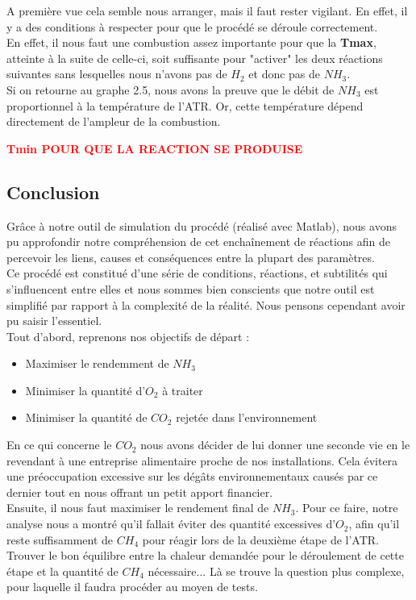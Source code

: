 \documentclass[12pt]{report}
\begin{document}
A première vue cela semble nous arranger, mais il faut rester vigilant. En effet, il y a des conditions à respecter pour que le procédé se déroule correctement.\\

En effet, il nous faut une combustion assez importante pour que la \textbf{Tmax}, atteinte à la suite de celle-ci, soit suffisante pour "activer" les deux réactions suivantes sans lesquelles nous n'avons pas de $H_2$ et donc pas de $NH_3$.\\
Si on retourne au graphe 2.5, nous avons la preuve que le débit de $NH_3$ est proportionnel à la température de l'ATR. Or, cette température dépend directement de l'ampleur de la combustion. 
\bigskip

\begin{Huge}
\textcolor{red}{\textbf{Tmin POUR QUE LA REACTION SE PRODUISE }}
\end{Huge}

{\textcolor{carmine}{\chapter{Conclusion}}}

Grâce à notre outil de simulation du procédé (réalisé avec Matlab), nous avons pu approfondir notre compréhension de cet enchaînement de réactions afin de percevoir les liens, causes et conséquences entre la plupart des paramètres.\\
Ce procédé est constitué d'une série de conditions, réactions, et subtilités qui s'influencent entre elles et nous sommes bien conscients que notre outil est simplifié par rapport à la complexité de la réalité. Nous pensons cependant avoir pu saisir l'essentiel.\\

Tout d'abord, reprenons nos objectifs de départ : \\
\begin{itemize}
\item Maximiser le rendemment de $NH_3$
\item Minimiser la quantité d'$O_2$ à traiter
\item Minimiser la quantité de $CO_2$ rejetée dans l'environnement
\end{itemize}

En ce qui concerne le $CO_2$ nous avons décider de lui donner une seconde vie en le revendant à une entreprise alimentaire proche de nos installations. Cela évitera une préoccupation excessive sur les dégâts environnementaux causés par ce dernier tout en nous offrant un petit apport financier.\\

Ensuite, il nous faut maximiser le rendement final de $NH_3$. Pour ce faire, notre analyse nous a montré qu'il fallait éviter des quantité excessives d'$O_2$, afin qu'il reste suffisamment de $CH_4$ pour réagir lors de la deuxième étape de l'ATR. Trouver le bon équilibre entre la chaleur demandée pour le déroulement de cette étape et la quantité de $CH_4$ nécessaire... Là se trouve la question plus complexe, pour laquelle il faudra procéder au moyen de tests.\\
\end{document}
